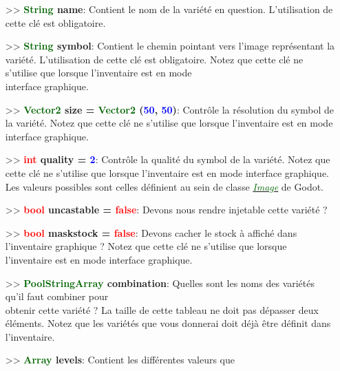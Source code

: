 \documentclass[a4paper, 11pt]{article}
\begin{document}
	\begin{itemize}
		\item[>> \textbf{\textcolor{darkgreen}{String} name}:] Contient le nom de la variété en question.
		L'utilisation de cette clé est obligatoire.\\
		\item[>> \textbf{\textcolor{darkgreen}{String} symbol}:] Contient le chemin pointant vers l'image 
		représentant la variété. L'utilisation de cette clé est obligatoire. Notez que cette clé ne 
		s'utilise que lorsque l'inventaire est en mode \\interface graphique.\\
		\newpage \item[>> \textbf{\textcolor{darkgreen}{Vector2} size = \textcolor{darkgreen}{Vector2}
		(\textcolor{blue}{50}, \textcolor{blue}{50})}:] Contrôle la résolution du symbol de la variété. 
		Notez que cette clé ne s'utilise que lorsque l'inventaire est en mode interface graphique.\\
		\item[>> \textbf{\textcolor{red}{int} quality = \textcolor{blue}{2}}:] Contrôle la qualité du symbol 
		de la variété. Notez que cette clé ne s'utilise que lorsque l'inventaire est en mode interface 
		graphique. Les valeurs possibles sont celles définient au sein de classe
		\href{https://docs.godotengine.org/en/stable/classes/class_image.html}
		{\textit{\textcolor{darkgreen}{Image}}} de Godot.\\
		\item[>> \textbf{\textcolor{red}{bool} uncastable = \textcolor{red}{false}}:] Devons nous rendre 
		injetable cette variété ?\\
		\item[>> \textbf{\textcolor{red}{bool} maskstock = \textcolor{red}{false}}:] Devons cacher le stock 
		à affiché dans l'inventaire graphique ? Notez que cette clé ne s'utilise que lorsque l'inventaire 
		est en mode interface graphique.\\
		\item[>> \textbf{\textcolor{darkgreen}{PoolStringArray} \hypertarget{combination}{combination}}:] 
		Quelles sont les noms des variétés qu'il faut combiner pour \\obtenir cette variété ? La taille de 
		cette tableau ne doit pas dépasser deux éléments. Notez que les variétés que vous donnerai doit déjà 
		être définit dans l'inventaire.\\
	 	\item[>> \textbf{\textcolor{darkgreen}{Array} levels}:] Contient les différentes valeurs que 

\end{itemize}
\end{document}
